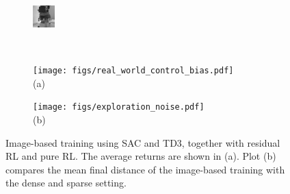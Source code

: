 \begin{figure}[thb]
\begin{subfigure}[b]{0.20\linewidth}
        \centering
    \end{subfigure}  \hfill
    \begin{subfigure}[b]{0.20\linewidth}
        \includegraphics[width=0.99\linewidth]{insertion/robot_view_screenshots/water_target_image4.png}\\
        \centering
    \end{subfigure}    
    \\
    \centering
    \begin{subfigure}[b]{0.40\linewidth}
        \texttt{[image: figs/real\_world\_control\_bias.pdf]}\\
        \centering
        (a)
    \end{subfigure} \hfil
    \begin{subfigure}[b]{0.49\linewidth}
        \texttt{[image: figs/exploration\_noise.pdf]}\\
        \centering
        (b)
    \end{subfigure}
    \caption{Image-based training using SAC and TD3, together with residual RL and pure RL. The average returns are shown in (a). Plot (b) compares the mean final distance of the image-based training with the dense and sparse setting. }
    \label{image_figure}
    \vspace{15pt}
\end{figure}
\fi


